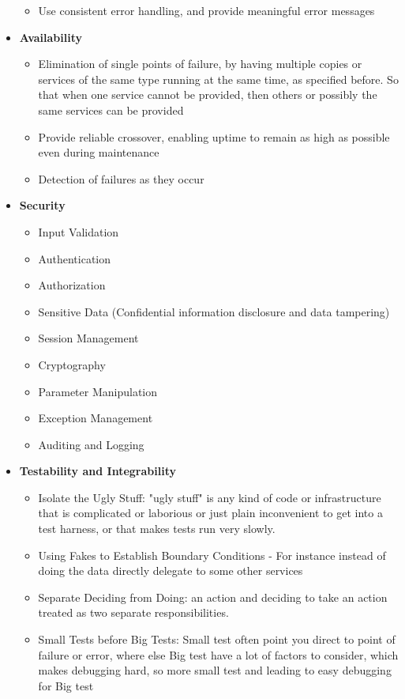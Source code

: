 \begin{itemize}
\begin{itemize}
			\item Use consistent error handling, and provide meaningful error messages
		\end{itemize}
	\item \textbf{Availability}
		\begin{itemize}
			\item Elimination of single points of failure, by having multiple copies or services of the same type running at the same time, as specified before. So that when one service cannot be provided, then others or possibly the same services can be provided
			\item Provide reliable crossover, enabling uptime to remain as high as possible even during maintenance
			\item Detection of failures as they occur
		\end{itemize}
	
	\item \textbf{Security}
		\begin{itemize}
			\item Input Validation
			\item Authentication
			\item Authorization
			\item Sensitive Data (Confidential information disclosure and data tampering)
			\item Session Management
			\item Cryptography
			\item Parameter Manipulation
			\item Exception Management
			\item Auditing and Logging
		\end{itemize}
	\item \textbf{Testability and Integrability}
		\begin{itemize}
			\item Isolate the Ugly Stuff: "ugly stuff" is any kind of code or infrastructure that is complicated or laborious or just plain inconvenient to get into a test harness, or that makes tests run very slowly.
			\item Using Fakes to Establish Boundary Conditions - For instance instead of doing the data directly delegate to some other services 
			\item Separate Deciding from Doing: an action and deciding to take an action treated as two separate responsibilities.
			\item Small Tests before Big Tests: Small test often point you direct to point of failure or error, where else Big test have a lot of factors to consider, which makes debugging hard, so more small test and leading to easy debugging for Big test


\end{itemize}
\end{itemize}

